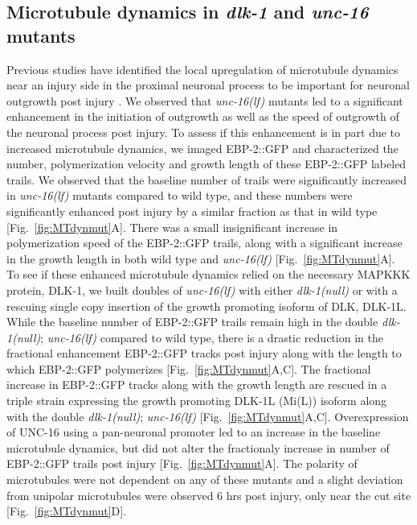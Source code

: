 \begin{appendices}
	 \subsection{Microtubule dynamics in \textit{dlk-1} and \textit{unc-16} mutants}
	 
	 Previous studies have identified the local upregulation of microtubule dynamics near an injury side in the proximal neuronal process to be important for neuronal outgrowth post injury \parencite{ghosh-roy2012}. We observed that \textit{unc-16(lf)} mutants led to a significant enhancement in the initiation of outgrowth as well as the speed of outgrowth of the neuronal process post injury. To assess if this enhancement is in part due to increased microtubule dynamics, we imaged EBP-2::GFP and characterized the number, polymerization velocity and growth length of these EBP-2::GFP labeled trails. We observed that the baseline number of trails were significantly increased in \textit{unc-16(lf)} mutants compared to wild type, and these numbers were significantly enhanced post injury by a similar fraction as that in wild type [Fig.~\ref{fig:MTdynmut}A]. There was a small insignificant increase in polymerization speed of the EBP-2::GFP trails, along with a significant increase in the growth length in both wild type and \textit{unc-16(lf)} [Fig.~\ref{fig:MTdynmut}A]. To see if these enhanced microtubule dynamics relied on the necessary MAPKKK protein, DLK-1, we built doubles of \textit{unc-16(lf)} with either \textit{dlk-1(null)} or with a rescuing single copy insertion of the growth promoting isoform of DLK, DLK-1L. While the baseline number of EBP-2::GFP trails remain high in the double \textit{dlk-1(null)}; \textit{unc-16(lf)} compared to wild type, there is a drastic reduction in the fractional enhancement EBP-2::GFP tracks post injury along with the length to which EBP-2::GFP polymerizes [Fig.~\ref{fig:MTdynmut}A,C]. The fractional increase in EBP-2::GFP tracks along with the growth length are rescued in a triple strain expressing the growth promoting DLK-1L (Mi(L)) isoform along with the double \textit{dlk-1(null)}; \textit{unc-16(lf)} [Fig.~\ref{fig:MTdynmut}A,C]. Overexpression of UNC-16 using a pan-neuronal promoter led to an increase in the baseline microtubule dynamics, but did not alter the fractionaly increase in number of EBP-2::GFP trails post injury [Fig.~\ref{fig:MTdynmut}A]. The polarity of microtubules were not dependent on any of these mutants and a slight deviation from unipolar microtubules were observed 6 hrs post injury, only near the cut site [Fig.~\ref{fig:MTdynmut}D].
	

\end{appendices}

